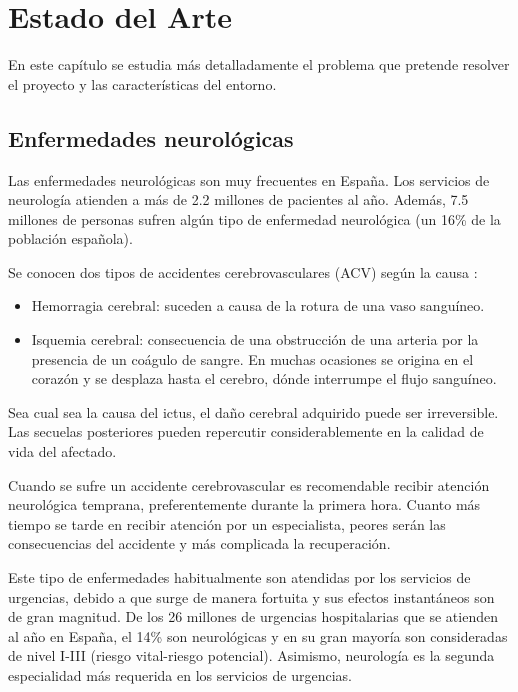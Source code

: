 \chapter{Estado del Arte\label{sec:estado_del_arte}}

En este capítulo se estudia más detalladamente el problema que pretende resolver el proyecto y las características del entorno.


\section{Enfermedades neurológicas}
\label{sec:dolencias2}

Las enfermedades neurológicas son muy frecuentes en España. Los servicios de neurología atienden a más de 2.2 millones de pacientes al año. Además, 7.5 millones de personas sufren algún tipo de enfermedad neurológica (un 16\% de la población española). 

Se conocen dos tipos de accidentes cerebrovasculares (ACV) según la causa \cite{tipoIctus}:
\begin{itemize}
	\item Hemorragia cerebral: suceden  a causa de la rotura de una vaso sanguíneo.
	\item Isquemia cerebral: consecuencia de una obstrucción de una arteria por la presencia de un coágulo de sangre. En muchas ocasiones se origina en el corazón y se desplaza hasta el cerebro, dónde interrumpe el flujo sanguíneo.
\end{itemize}

Sea cual sea la causa del ictus, el daño cerebral adquirido puede ser irreversible. Las secuelas posteriores pueden repercutir considerablemente en la calidad de vida del afectado.

Cuando se sufre un accidente cerebrovascular es recomendable recibir atención neurológica temprana, preferentemente durante la primera hora. Cuanto más tiempo se tarde en recibir atención por un especialista, peores serán las consecuencias del accidente y más complicada la recuperación.

Este tipo de enfermedades habitualmente son atendidas por los servicios de urgencias, debido a que surge de manera fortuita y sus efectos instantáneos son de gran magnitud. De los 26 millones de urgencias hospitalarias que se atienden al año en España, el 14\% son neurológicas y en su gran mayoría son consideradas de nivel I-III (riesgo vital-riesgo potencial). Asimismo, neurología es la segunda especialidad más requerida en los servicios de urgencias.

